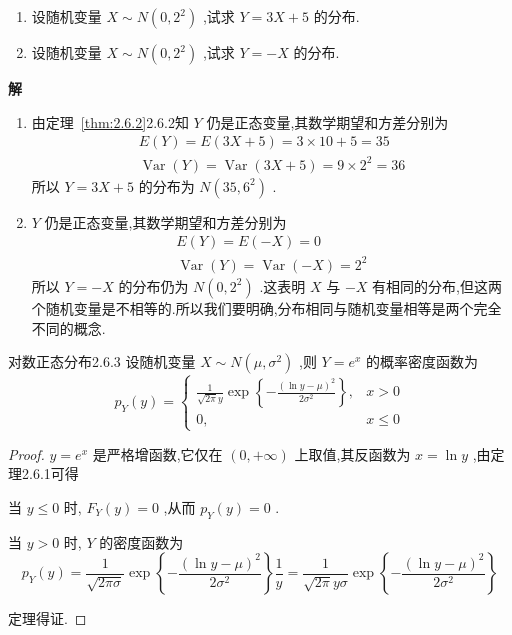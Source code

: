 \begin{example}\label{exam:2.6.2}
	\begin{enumerate}
		\item 设随机变量 $ X \sim N\left(0,2^{2}\right) $ ,试求 $ Y=3X+5 $ 的分布.
		\item 设随机变量 $ X \sim N\left(0,2^{2}\right) $ ,试求 $ Y=-X $ 的分布.
	\end{enumerate}
	
	\textbf{解}
	
	\begin{enumerate}
		\item 由定理~\ref{thm:2.6.2}2.6.2知 $ Y $ 仍是正态变量,其数学期望和方差分别为
		\[
		\begin{array}{l}
		{E(Y)=E(3 X+5)=3 \times 10+5=35} \\
		{\operatorname{Var}(Y)=\operatorname{Var}(3 X+5)=9 \times 2^{2}=36}
		\end{array}
		\]
		所以 $ Y=3X+5 $ 的分布为 $ N\left(35,6^{2}\right) $ .
		\item $ Y $ 仍是正态变量,其数学期望和方差分别为
		\[
		\begin{array}{l}
		{E(Y)=E(-X)=0} \\ {\operatorname{Var}(Y)=\operatorname{Var}(-X)=2^{2}}
		\end{array}
		\]
		所以 $ Y=-X $ 的分布仍为 $ N\left(0,2^{2}\right) $ .这表明 $ X $ 与 $ -X $ 有相同的分布,但这两个随机变量是不相等的.所以我们要明确,分布相同与随机变量相等是两个完全不同的概念.
	\end{enumerate}
\end{example}

\begin{theorem}{对数正态分布}{2.6.3}
	设随机变量 $ X \sim N\left(\mu, \sigma^{2}\right) $ ,则 $ Y=e^{x} $ 的概率密度函数为
	\begin{equation}
	p_{Y}(y)=\left\{\begin{array}{ll}
	{\frac{1}{\sqrt{2 \pi} y} \exp \left\{-\frac{(\ln y-\mu)^{2}}{2 \sigma^{2}}\right\},} & {x>0} \\ 
	{0,} & {x \leqslant 0}
	\end{array}\right. \label{eq:2.6.2}
	\end{equation}
\end{theorem}

\begin{proof}
	 $ y=e^{x} $ 是严格增函数,它仅在 $ (0,+\infty) $ 上取值,其反函数为 $ x=\ln y $ ,由定理2.6.1可得
	
	当 $ y \leqslant 0 $ 时, $ F_{Y}(y)=0 $ ,从而 $ p_{Y}(y)=0 $ .
	
	当 $ y>0 $ 时, $ Y $ 的密度函数为
	\[
	p_{Y}(y)=\frac{1}{\sqrt{2 \pi \sigma}} \exp \left\{-\frac{(\ln y-\mu)^{2}}{2 \sigma^{2}}\right\} \frac{1}{y}=\frac{1}{\sqrt{2 \pi} y \sigma} \exp \left\{-\frac{(\ln y-\mu)^{2}}{2 \sigma^{2}}\right\}
	\]
	
	定理得证.
\end{proof} 


